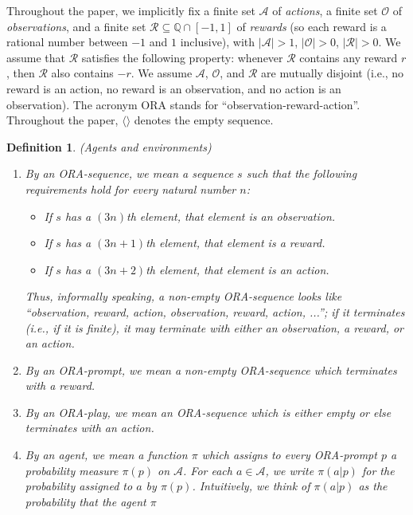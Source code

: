 \documentclass{article}
\newtheorem{definition}[theorem]{Definition}
\begin{document}
Throughout the paper, we implicitly
fix a finite set $\mathcal A$ of \emph{actions},
a finite set $\mathcal O$ of \emph{observations},
and a finite set $\mathcal R\subseteq \mathbb Q\cap [-1,1]$ of \emph{rewards}
(so each reward is a rational number between $-1$ and $1$ inclusive),
with $|\mathcal A|>1$,
$|\mathcal O|>0$, $|\mathcal R|>0$.
We assume that $\mathcal R$ satisfies the following property:
whenever $\mathcal R$ contains any reward $r$, then $\mathcal R$
also contains $-r$.
We assume $\mathcal A$, $\mathcal O$, and $\mathcal R$ are mutually disjoint
(i.e., no reward is an action, no reward is an observation, and no action is an
observation).
The acronym ORA stands for ``observation-reward-action''.
Throughout the paper, $\langle\rangle$ denotes the empty sequence.

\begin{definition}
\label{omnibusdefn}
    (Agents and environments)
    \begin{enumerate}
        \item
        By an \emph{ORA-sequence}, we mean a sequence $s$ such that the following requirements
        hold for every natural number $n$:
        \begin{itemize}
            \item If $s$ has a $(3n)$th element, that element is an observation.
            \item If $s$ has a $(3n+1)$th element, that element is a reward.
            \item If $s$ has a $(3n+2)$th element, that element is an action.
        \end{itemize}
        Thus, informally speaking, a non-empty ORA-sequence
        looks like ``observation, reward, action, observation, reward, action, ...'';
        if it terminates (i.e., if it is finite), it may terminate with
        either an observation, a reward, or an action.
        \item
        By an \emph{ORA-prompt}, we mean a non-empty ORA-sequence which
        terminates with a reward.
        \item
        By an \emph{ORA-play}, we mean an ORA-sequence which is either empty or else
        terminates with an action.
        \item
        By an \emph{agent}, we mean a function $\pi$ which assigns to every
        ORA-prompt $p$ a probability measure $\pi(p)$ on $\mathcal A$.
        For each $a\in\mathcal A$,
        we write $\pi(a|p)$ for the probability assigned to $a$ by $\pi(p)$.
        Intuitively, we think of $\pi(a|p)$ as the probability that the agent $\pi$

\end{enumerate}
\end{definition}
\end{document}
